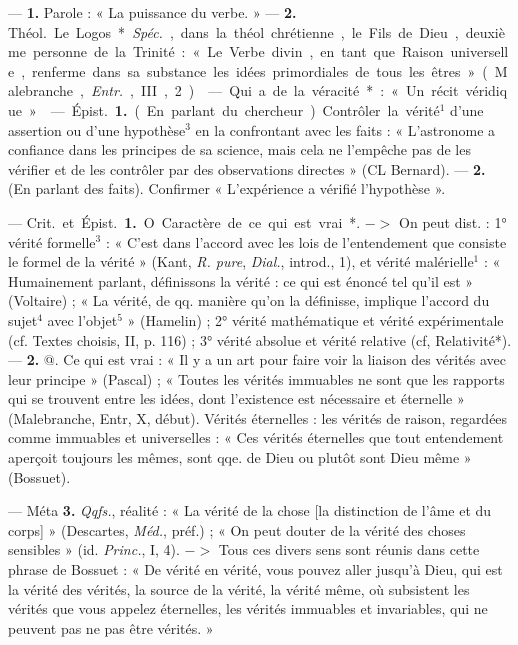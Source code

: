 \begin{itemize}[leftmargin=1cm, label=, itemsep=1pt]
 — {\bf 1.} Parole : « La puissance
du verbe. » —  {\bf 2.} \si{Théol.} Le Logos*.
{\it Spéc.}, dans la théol. chrétienne, le
Fils de Dieu, deuxième personne de
la Trinité : « Le Verbe divin, en tant
que Raison universelle, renferme
dans sa substance les idées primordiales de tous les êtres » (Malebranche, {\it Entr.}, III, 2).

 — Qui a de la véracité* :
« Un récit véridique. »

 — \si{Épist.} {\bf 1.} (En parlant du
chercheur). Contrôler la vérité$^1$ d’une
assertion ou d’une hypothèse$^3$ en
la confrontant avec les faits : « L’astronome a confiance dans les principes de sa science, mais cela ne
l'empêche pas de les vérifier et de
les contrôler par des observations
directes » (CL Bernard). —  {\bf 2.} (En
parlant des faits). Confirmer
« L'expérience a vérifié l’hypothèse ».

 — \si{Crit.} et \si{Épist.} {\bf 1.} O. Caractère de ce qui est vrai*. $->$ On
peut dist. : 1° vérité formelle$^3$ :
« C’est dans l’accord avec les lois
de l’entendement que consiste le
formel de la vérité » (Kant, {\it R. pure},
{\it Dial.}, introd., 1), et vérité malérielle$^1$ : « Humainement parlant,
définissons la vérité : ce qui est
énoncé tel qu'il est » (Voltaire) ;
« La vérité, de qq. manière qu’on la
définisse, implique l'accord du sujet$^4$
avec l’objet$^5$ » (Hamelin) ; 2° vérité
mathématique et vérité expérimentale (cf. Textes choisis, II, p. 116) ;
3° vérité absolue et vérité relative
(cf, Relativité*). —  {\bf 2.} @. Ce qui est
vrai : « Il y a un art pour faire voir
la liaison des vérités avec leur principe » (Pascal) ; « Toutes les vérités
immuables ne sont que les rapports
qui se trouvent entre les idées, dont
l'existence est nécessaire et éternelle » (Malebranche, Entr, X,
début). Vérités éternelles : les vérités
de raison, regardées comme immuables et universelles : « Ces vérités
éternelles que tout entendement
aperçoit toujours les mêmes, sont
qqe. de Dieu ou plutôt sont Dieu
même » (Bossuet).

— Méta  {\bf 3.} {\it Qqfs.}, réalité : « La
vérité de la chose [la distinction de
l’âme et du corps] » (Descartes,
\si{{\it Méd.}}, préf.) ; « On peut douter de la
vérité des choses sensibles » (id.
{\it Princ.}, I, 4). $->$ Tous ces divers
sens sont réunis dans cette phrase
de Bossuet : « De vérité en vérité,
vous pouvez aller jusqu'à Dieu,
qui est la vérité des vérités, la source
de la vérité, la vérité même, où subsistent les vérités que vous appelez
éternelles, les vérités immuables et
invariables, qui ne peuvent pas ne
pas être vérités. »


\end{itemize}
